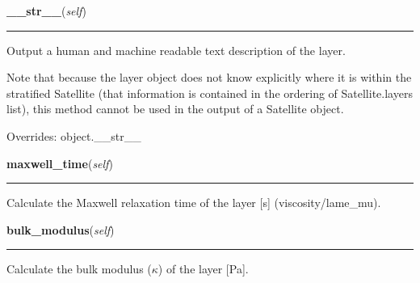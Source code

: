\hspace{.8\funcindent}\begin{boxedminipage}{\funcwidth}

    \raggedright \textbf{\_\_str\_\_}(\textit{self})

    \vspace{-1.5ex}

    \rule{\textwidth}{0.5\fboxrule}
\setlength{\parskip}{2ex}
    Output a human and machine readable text description of the layer.

    Note that because the layer object does not know explicitly where it is
    within the stratified Satellite (that information is contained in the 
    ordering of Satellite.layers list), this method cannot be used in the 
    output of a Satellite object.

\setlength{\parskip}{1ex}
      Overrides: object.\_\_str\_\_

    \end{boxedminipage}

    \label{satstress:SatStress:SatLayer:maxwell_time}

    \vspace{0.5ex}

\hspace{.8\funcindent}\begin{boxedminipage}{\funcwidth}

    \raggedright \textbf{maxwell\_time}(\textit{self})

    \vspace{-1.5ex}

    \rule{\textwidth}{0.5\fboxrule}
\setlength{\parskip}{2ex}
    Calculate the Maxwell relaxation time of the layer [s] 
    (viscosity/lame\_mu).

\setlength{\parskip}{1ex}
    \end{boxedminipage}

    \label{satstress:SatStress:SatLayer:bulk_modulus}

    \vspace{0.5ex}

\hspace{.8\funcindent}\begin{boxedminipage}{\funcwidth}

    \raggedright \textbf{bulk\_modulus}(\textit{self})

    \vspace{-1.5ex}

    \rule{\textwidth}{0.5\fboxrule}
\setlength{\parskip}{2ex}
    Calculate the bulk modulus (\(\kappa\)) of the layer [Pa].

\setlength{\parskip}{1ex}
    \end{boxedminipage}

